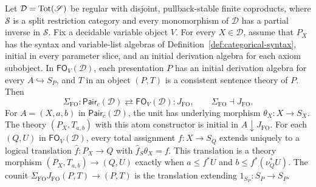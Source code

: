 \begin{theorem}
\label{thm:free-first-order-adjunction}
Let $\mathcal D=\operatorname{Tot}(\mathscr S)$ be regular with disjoint,
pullback-stable finite coproducts, where $\mathscr S$ is a split
restriction category and every monomorphism of $\mathcal D$ has a partial
inverse in $\mathscr S$. Fix a decidable variable object $V$. For every
$X\in\mathcal D$, assume that $P_X$ has the syntax and variable-list
algebras of Definition~\ref{def:categorical-syntax}, initial in every
parameter slice, and an initial derivation algebra for each axiom
subobject. In $\mathsf{FO}_V(\mathcal D)$, each presentation $P$
has an initial derivation algebra for every $A\hookrightarrow S_P$,
and $T$ in an object $(P,T)$ is a consistent sentence theory of $P$.
Then
\[
 \Sigma_{\mathrm{FO}}:
 \mathsf{Pair}_c(\mathcal D)\rightleftarrows
 \mathsf{FO}_V(\mathcal D):J_{\mathrm{FO}},\qquad
 \Sigma_{\mathrm{FO}}\dashv J_{\mathrm{FO}}.
\]
For $A=(X,a,b)$ in $\mathsf{Pair}_c(\mathcal D)$, the unit has
underlying morphism $\theta_X:X\to S_X$. The theory $(P_X,T_{a,b})$
with this atom constructor is initial in $A\downarrow J_{\mathrm{FO}}$.
For each $(Q,U)$ in $\mathsf{FO}_V(\mathcal D)$, every total
assignment $f:X\to S_Q$ extends uniquely to a logical translation
$\widehat f:P_X\to Q$ with $\widehat f_S\theta_X=f$. This translation
is a theory morphism $(P_X,T_{a,b})\to(Q,U)$ exactly when
$a\leq f^*U$ and $b\leq f^*(\nu_Q^*U)$.
The counit $\Sigma_{\mathrm{FO}}J_{\mathrm{FO}}(P,T)\to(P,T)$
is the translation extending $1_{S_P}:S_P\to S_P$.
\end{theorem}
